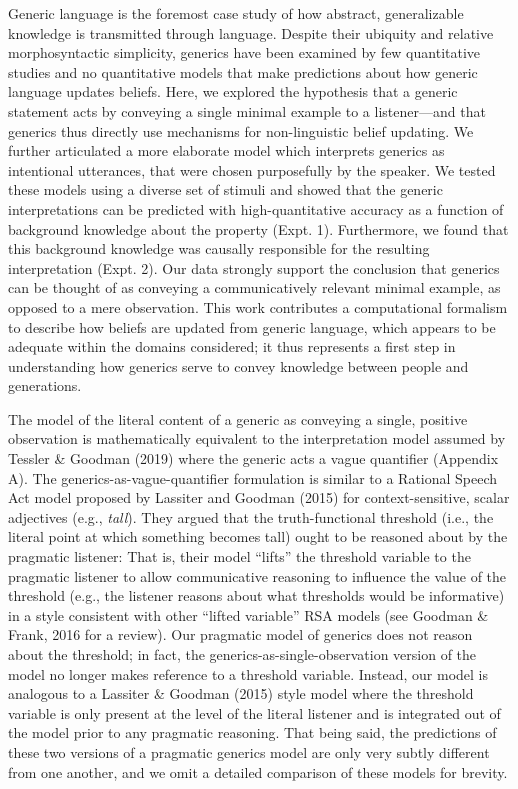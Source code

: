 \documentclass[floatsintext,doc]{apa6}
\begin{document}
Generic language is the foremost case study of how abstract, generalizable knowledge is transmitted through language.
Despite their ubiquity and relative morphosyntactic simplicity, generics have been examined by few quantitative studies and no quantitative models that make predictions about how generic language updates beliefs.
Here, we explored the hypothesis that a generic statement acts by conveying a single minimal example to a listener---and that generics thus directly use mechanisms for non-linguistic belief updating.
We further articulated a more elaborate model which interprets generics as intentional utterances, that were chosen purposefully by the speaker.
We tested these models using a diverse set of stimuli and showed that the generic interpretations can be predicted with high-quantitative accuracy as a function of background knowledge about the property (Expt. 1).
Furthermore, we found that this background knowledge was causally responsible for the resulting interpretation (Expt. 2).
Our data strongly support the conclusion that generics can be thought of as conveying a communicatively relevant minimal example, as opposed to a mere observation. 
This work contributes a computational formalism to describe how beliefs are updated from generic language, which appears to be adequate within the domains considered; it thus represents a first step in understanding how generics serve to convey knowledge between people and generations.


The model of the literal content of a generic as conveying a single, positive observation is mathematically equivalent to the interpretation model assumed by Tessler \& Goodman (2019) where the generic acts a vague quantifier (Appendix A). 
The generics-as-vague-quantifier formulation is similar to a Rational Speech Act model proposed by Lassiter and Goodman (2015) for context-sensitive, scalar adjectives (e.g., \emph{tall}).
They argued that the truth-functional threshold (i.e., the literal point at which something becomes tall) ought to be reasoned about by the pragmatic listener: That is, their model ``lifts'' the threshold variable to the pragmatic listener to allow communicative reasoning to influence the value of the threshold (e.g., the listener reasons about what thresholds would be informative) in a style consistent with other ``lifted variable'' RSA models (see Goodman \& Frank, 2016 for a review). 
Our pragmatic model of generics does not reason about the threshold; in fact, the generics-as-single-observation version of the model no longer makes reference to a threshold variable. 
Instead, our model is analogous to a Lassiter \& Goodman (2015) style model where the threshold variable is only present at the level of the literal listener and is integrated out of the model prior to any pragmatic reasoning. 
That being said, the predictions of these two versions of a pragmatic generics model are only very subtly different from one another, and we omit a detailed comparison of these models for brevity. 
\end{document}
